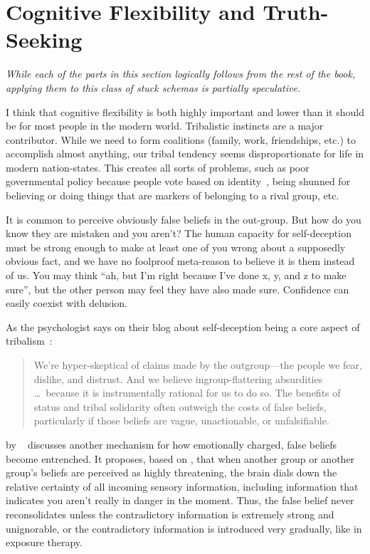 \documentclass[11pt,oneside]{book}
\let\cite\parencite
\newcommand{\prosecite}[1]{\citetitle{#1} by \citefullauthor{#1}~\cite{#1}}
\begin{document}
\section{Cognitive Flexibility and Truth-Seeking}
\label{cognitiveflexibility}
\textit{While each of the parts in this section logically follows from the rest of the book, applying them to this class of stuck schemas is partially speculative.}

I think that cognitive flexibility is both highly important and lower than it should be for most people in the modern world. Tribalistic instincts are a major contributor. While we need to form coalitions (family, work, friendships, etc.) to accomplish almost anything, our tribal tendency seems disproportionate for life in modern nation-states. This creates all sorts of problems, such as poor governmental policy because people vote based on identity~\cite{klein2020Polarized}, being shunned for believing or doing things that are markers of belonging to a rival group, etc.

It is common to perceive obviously false beliefs in the out-group. But how do you know they are mistaken and you aren't? The human capacity for self-deception must be strong enough to make at least one of you wrong about a supposedly obvious fact, and we have no foolproof meta-reason to believe it is them instead of us. You may think \enquote{ah, but I'm right because I've done x, y, and z to make sure}, but the other person may feel they have also made sure. Confidence can easily coexist with delusion.

As the psychologist  says on their blog about self-deception being a core aspect of tribalism~\cite{pinsof2024Truth}:
\begin{quotation}
	We're hyper-skeptical of claims made by the outgroup---the people we fear, dislike, and distrust. And we believe ingroup-flattering absurdities \dots\ because it is instrumentally rational for us to do so. The benefits of status and tribal solidarity often outweigh the costs of false beliefs, particularly if those beliefs are vague, unactionable, or unfalsifiable.
\end{quotation}

\prosecite{alexanderTrapped} discusses another mechanism for how emotionally charged, false beliefs become entrenched. It proposes, based on \textcite{berghBSTS}, that when another group or another group's beliefs are perceived as highly threatening, the brain dials down the relative certainty of all incoming sensory information, including information that indicates you aren't really in danger in the moment. Thus, the false belief never reconsolidates unless the contradictory information is extremely strong and unignorable, or the contradictory information is introduced very gradually, like in exposure therapy.
\end{document}
